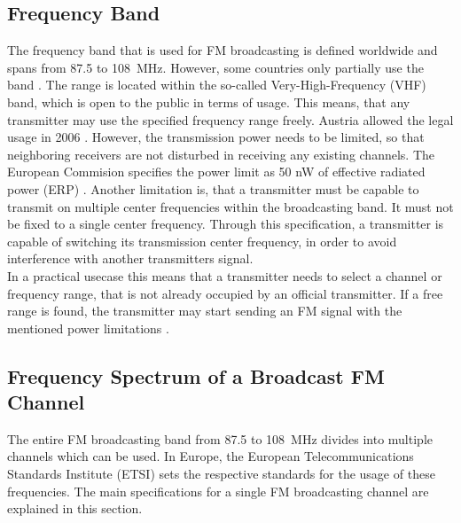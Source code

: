 \subsection{Frequency Band}
\label{sec:FrequencyBand}

The frequency band that is used for FM broadcasting is defined worldwide and spans from 87.5 to 108~MHz.
However, some countries only partially use the band \cite[RR5-39]{ItuRadioRegulations}.
The range is located within the so-called Very-High-Frequency (VHF) band, which is open to the public in terms of usage.
This means, that any transmitter may use the specified frequency range freely.
Austria allowed the legal usage in 2006 \cite{AustriaRundfunkgesetz2014}.
However, the transmission power needs to be limited, so that neighboring receivers are not disturbed in receiving any existing channels.
The European Commision specifies the power limit as 50 nW of effective radiated power (ERP) \cite{EuCommissionRadioSpectrumHarmonization}.
Another limitation is, that a transmitter must be capable to transmit on multiple center frequencies within the broadcasting band.
It must not be fixed to a single center frequency.
Through this specification, a transmitter is capable of switching its transmission center frequency, in order to avoid interference with another transmitters signal.\\

In a practical usecase this means that a transmitter needs to select a channel or frequency range, that is not already occupied by an official transmitter.
If a free range is found, the transmitter may start sending an FM signal with the mentioned power limitations \cite{EbuFmRegulators}.



\subsection{Frequency Spectrum of a Broadcast FM Channel}
\label{sec:FrequencySpectrumOfABroadcastFmChannel}

The entire FM broadcasting band from 87.5 to 108~MHz divides into multiple channels which can be used.
In Europe, the European Telecommunications Standards Institute (ETSI) sets the respective standards for the usage of these frequencies.
The main specifications for a single FM broadcasting channel are explained in this section.\\

